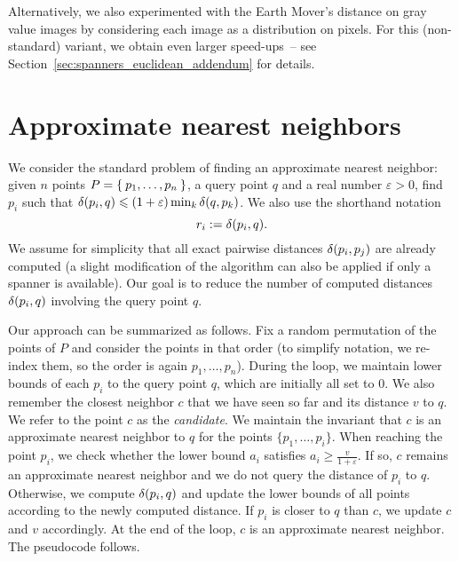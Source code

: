 \documentclass{ws-ijcga}
\renewcommand{\leq}{\leqslant}
\renewcommand{\geq}{\geqslant}
\newcommand{\eps}{\varepsilon}
\begin{document}
Alternatively, we also experimented with the Earth Mover’s distance on
gray value images by considering each image as a distribution on pixels.
For this (non-standard) variant, we obtain even larger speed-ups~-- see
Section~\ref{sec:spanners_euclidean_addendum} for details.


\section{Approximate nearest neighbors}
\label{sec:ann}
We consider the standard problem of finding an approximate nearest neighbor: given
$n$ points $P = \Set{p_1, \dots, p_n}$, a query point $q$ and a real number $\eps > 0$,
find $p_i$ such that $\dist(p_i, q) \leq (1 + \eps) \min_{k} \dist(q, p_k)$. We also use the shorthand notation
\[
    r_i := \delta(p_i, q).
\]
We assume for simplicity
that all exact pairwise distances $\delta(p_i, p_j)$ are already computed
(a slight modification of the algorithm can also be applied if only a spanner is available).
Our goal is to reduce the number of computed distances $\delta(p_i, q)$ involving the query point $q$.

Our approach can be summarized as follows. 
Fix a random permutation of the points of $P$ 
and consider the points in that order 
(to simplify notation,
we re-index them, so the order is again $p_1, \dots, p_n$).
During the loop, we maintain lower bounds of each $p_i$
to the query point $q$, which are initially all set to $0$.
We also remember the closest neighbor $c$ that we have seen so
far and its distance $v$ to $q$.
We refer to the point $c$ as the \emph{candidate}.
We maintain the invariant that $c$ is an approximate nearest neighbor
to $q$ for the points $\{p_1,\ldots,p_i\}$.
When reaching the point $p_i$, we check whether the lower
bound $a_i$ satisfies $a_i\geq \frac{v}{1+\eps}$.
If so, $c$ remains an approximate nearest neighbor and
we do not query the distance of $p_i$ to $q$.
Otherwise, we compute $\delta(p_i,q)$ and update the lower bounds
of all points according to the newly computed distance.
If $p_i$ is closer to $q$ than $c$, we update $c$ and $v$
accordingly. At the end of the loop, $c$ is an approximate nearest
neighbor. The pseudocode follows.


\begin{algorithmic}
\label{alg:ann_blind}

\Function{ApproximateNearestNeighbor}{$P, q, \eps$}
    \State {}
        \If {$a_i \geq \frac{v}{1+\eps}$}
        \Else
            \State {}
            \EndIf
        \EndIf
    \EndFor
    \State {}
\EndFunction
\end{algorithmic}
\end{document}
